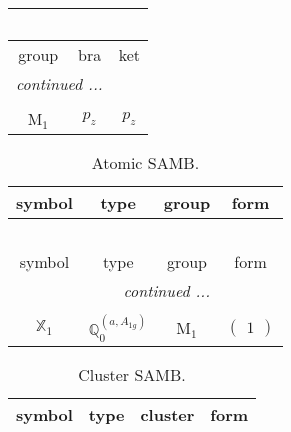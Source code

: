 \documentclass[fleqn,10pt,landscape]{article}
\begin{document}
\begin{itemize}
\begin{center}
\begin{longtable}{c|c|c}
\multicolumn{2}{l}{\tablename\ \thetable{}} \\
 \hline \hline
group & bra & ket \\ \hline \endhead

 \hline \hline
\multicolumn{2}{r}{\footnotesize\it continued ...} \\ \endfoot

 \hline \hline
\multicolumn{2}{r}{} \\ \endlastfoot

M$_{1}$ & $p_{z}$ & $p_{z}$ \\
\end{longtable}
\end{center}
\begin{center}
\renewcommand{\arraystretch}{1.3}
\begin{longtable}{c|c|c|c}
\caption{Atomic SAMB.}
 \\
 \hline \hline
symbol & type & group & form \\ \hline \endfirsthead

\multicolumn{3}{l}{\tablename\ \thetable{}} \\
 \hline \hline
symbol & type & group & form \\ \hline \endhead

 \hline \hline
\multicolumn{3}{r}{\footnotesize\it continued ...} \\ \endfoot

 \hline \hline
\multicolumn{3}{r}{} \\ \endlastfoot

$ \mathbb{X}_{1} $ & $\mathbb{Q}_{0}^{(a,A_{1g})}$ & M$_{1}$ & $\begin{pmatrix} 1 \end{pmatrix}$ \\
\end{longtable}
\end{center}
\begin{center}
\renewcommand{\arraystretch}{1.3}
\begin{longtable}{c|c|c|c}
\caption{Cluster SAMB.}
 \\
 \hline \hline
symbol & type & cluster & form \\ \hline \endfirsthead


\end{longtable}
\end{center}
\end{itemize}
\end{document}
